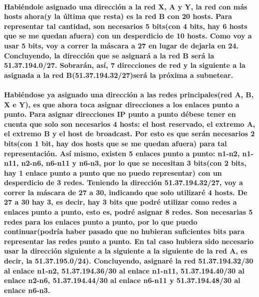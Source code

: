 \documentclass[11pt]{article} %
\begin{document}
        \paragraph{Habiéndole asignado una dirección a la red X, A y Y, la red con más hosts ahora(y la última que resta) es la red B con 20 hosts. Para representar tal cantidad, son necesarios 5 bits(con 4 bits, hay 6 hosts que se me quedan afuera) con un desperdicio de 10 hosts. Como voy a usar 5 bits, voy a correr la máscara a 27 en lugar de dejarla en 24. Concluyendo, la dirección que se asignará a la red B será la 51.37.194.0/27. Sobrarán, así, 7 direcciones de red y la siguiente a la asignada a la red B(51.37.194.32/27)será la próxima a subnetear.}
        \paragraph{Habiéndose ya asignado una dirección a las redes principales(red A, B, X e Y), es que ahora toca asignar direcciones a los enlaces punto a punto. Para asignar direcciones IP punto a punto débese tener en cuenta que solo son necesarios 4 hosts: el host reservado, el extremo A, el extremo B y el host de broadcast. Por esto es que serán necesarios 2 bits(con 1 bit, hay dos hosts que se me quedan afuera) para tal representación. Así mismo, existen 5 enlaces punto a punto: n1-n2, n1-n11, n2-n6, n6-n11 y n6-n3, por lo que se necesitan 3 bits(con 2 bits, hay 1 enlace punto a punto que no puedo representar) con un desperdicio de 3 redes. Teniendo la dirección 51.37.194.32/27, voy a correr la máscara de 27 a 30, indicando que solo utilizaré 4 hosts. De 27 a 30 hay 3, es decir, hay 3 bits que podré utilizar como redes a enlaces punto a punto, esto es, podré asignar 8 redes. Son necesarias 5 redes para los enlaces punto a punto, por lo que puedo continuar(podría haber pasado que no hubieran suficientes bits para representar las redes punto a punto. En tal caso hubiera sido necesario usar la dirección siguiente a la siguiente a la siguiente de la red A, es decir, la 51.37.195.0/24). Concluyendo, asignaré la red 51.37.194.32/30 al enlace n1-n2, 51.37.194.36/30 al enlace n1-n11, 51.37.194.40/30 al enlace n2-n6, 51.37.194.44/30 al enlace n6-n11 y 51.37.194.48/30 al enlace n6-n3.}
\end{document}
